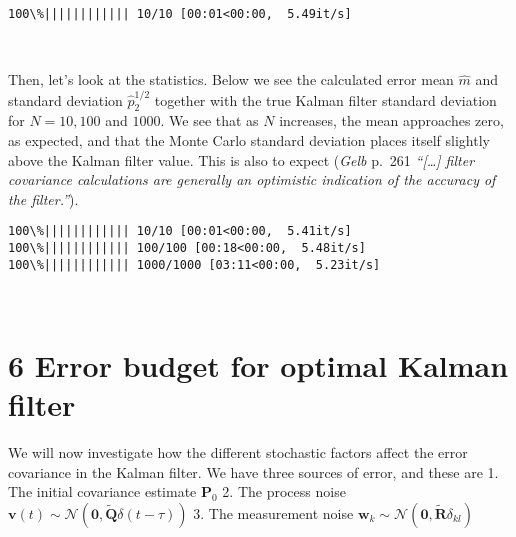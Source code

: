 \documentclass[11pt]{article}
\begin{document}
    \begin{Verbatim}[commandchars=\\\{\}]
100\%|||||||||||| 10/10 [00:01<00:00,  5.49it/s]
    \end{Verbatim}



    \begin{center}
    \end{center}
    { \hspace*{\fill} \\}
    
    Then, let's look at the statistics. Below we see the calculated error
mean \(\hat{m}\) and standard deviation \(\hat{p}_2^{1/2}\) together
with the true Kalman filter standard deviation for \(N=10, 100\) and
\(1000\). We see that as \(N\) increases, the mean approaches zero, as
expected, and that the Monte Carlo standard deviation places itself
slightly above the Kalman filter value. This is also to expect
(\emph{Gelb} p.~261 \emph{``{[}\ldots{]} filter covariance calculations
are generally an optimistic indication of the accuracy of the
filter.''}).



    \begin{Verbatim}[commandchars=\\\{\}]
100\%|||||||||||| 10/10 [00:01<00:00,  5.41it/s]
100\%|||||||||||| 100/100 [00:18<00:00,  5.48it/s]
100\%|||||||||||| 1000/1000 [03:11<00:00,  5.23it/s]
    \end{Verbatim}

    \begin{center}
    \end{center}
    { \hspace*{\fill} \\}
    
    \hypertarget{error-budget-for-optimal-kalman-filter}{%
\section*{6 Error budget for optimal Kalman
filter}\label{error-budget-for-optimal-kalman-filter}}

    We will now investigate how the different stochastic factors affect the
error covariance in the Kalman filter. We have three sources of error,
and these are 1. The initial covariance estimate \(\mathbf{P}_0\) 2. The
process noise
\(\mathbf{v}(t) \sim \mathcal{N}(\mathbf{0}, \tilde{\mathbf{Q}} \delta(t-\tau))\)
3. The measurement noise
\(\mathbf{w}_k \sim \mathcal{N}(\mathbf{0}, \tilde{\mathbf{R}} \delta_{kl})\)
\end{document}
